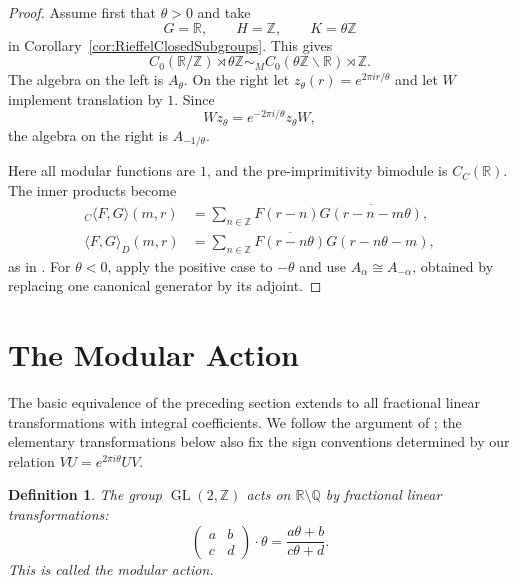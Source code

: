 \documentclass{book}
\newtheorem{definition}{Definition}[section]
\begin{document}
\begin{proof}
  Assume first that \(\theta>0\) and take
  \[
    G=\mathbb R,\qquad H=\mathbb Z,\qquad K=\theta\mathbb Z
  \]
  in Corollary~\ref{cor:RieffelClosedSubgroups}.  This gives
  \[
    C_0(\mathbb R/\mathbb Z)\rtimes\theta\mathbb Z
      \sim_M
    C_0(\theta\mathbb Z\backslash\mathbb R)\rtimes\mathbb Z.
  \]
  The algebra on the left is \(A_\theta\).  On the right let
  \(z_\theta(r)=e^{2\pi ir/\theta}\) and let \(W\) implement translation by
  \(1\).  Since
  \[
    Wz_\theta=e^{-2\pi i/\theta}z_\theta W,
  \]
  the algebra on the right is \(A_{-1/\theta}\).

  Here all modular functions are \(1\), and the pre-imprimitivity bimodule is
  \(C_C(\mathbb R)\).  The inner products become
  \begin{align*}
    {}_C\!\langle F,G\rangle(m,r)
      &=\sum_{n\in\mathbb Z}
        F(r-n)\overline{G(r-n-m\theta)},\\
    \langle F,G\rangle_D(m,r)
      &=\sum_{n\in\mathbb Z}
        \overline{F(r-n\theta)}G(r-n\theta-m),
  \end{align*}
  as in \cite[pp.~426--427]{Rieffel1981}.  For \(\theta<0\), apply the
  positive case to \(-\theta\) and use
  \(A_\alpha\cong A_{-\alpha}\), obtained by replacing one canonical
  generator by its adjoint.
\end{proof}

\section{The Modular Action}

The basic equivalence of the preceding section extends to all fractional
linear transformations with integral coefficients.  We follow the argument
of \cite[Section~2]{Rieffel1981}; the elementary transformations below also
fix the sign conventions determined by our relation
\(VU=e^{2\pi i\theta}UV\).

\begin{definition}\label{def:ModularAction}
  The group \(\operatorname{GL}(2,\mathbb Z)\) acts on
  \(\mathbb R\setminus\mathbb Q\) by fractional linear transformations:
  \[
    \begin{pmatrix}a&b\\c&d\end{pmatrix}\cdot\theta
      =\frac{a\theta+b}{c\theta+d}.
  \]
  This is called the \textnormal{modular action}.
\end{definition}
\end{document}
